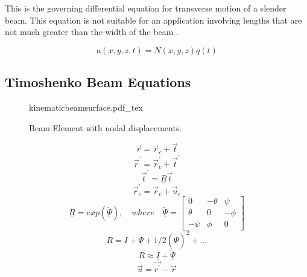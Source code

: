 This is the governing differential equation for transverse motion of a slender beam. This equation is not suitable for an application involving lengths that are not much greater than the width of the beam \cite{genta2007dynamics}.

\begin{equation} \label{eq:FEGoverning}
u(x,y,z,t)=N(x,y,z)q(t)
\end{equation}

\subsection{Timoshenko Beam Equations}

\begin{figure}
	\centering
	\def\svgwidth{400pt}
	{kinematicbeamsurface.pdf_tex}
	\caption{Beam Element with nodal displacements.}
	\label{fig:KineBeamElem}
\end{figure}
\begin{equation}\label{eq:r}
\vec{r}=\vec{r}_c+\vec{t}
\end{equation}
\begin{equation}\label{eq:rprime}
\vec{r}^\prime=\vec{r}_c^\prime+\vec{t}^\prime
\end{equation}
\begin{equation}\label{eq:trot}
\vec{t}^\prime=\underline{R}\vec{t}
\end{equation}
\begin{equation}\label{eq:rtrans}
\vec{r}_c^\prime=\vec{r}_c+\vec{u}_c
\end{equation}
\begin{equation}\label{eq:RotTransformation}
\underline{R}=exp\left(\tilde{\underline{\Psi}}\right), \quad where\quad \tilde{\underline{\Psi}}=\left[\begin{array}{ccc}
0&-\theta&\psi\\
\theta&0&-\phi\\
-\psi&\phi&0
\end{array}\right]
\end{equation}
\begin{equation}\label{eq:RotTransformationExpanded}
R=\underline{I}+\tilde{\underline{\Psi}}+1/2\left(\tilde{\underline{\Psi}}\right)^2+...
\end{equation}
\begin{equation}\label{eq:RotTransformationApprox}
R\approx\underline{I}+\tilde{\underline{\Psi}}
\end{equation}
\begin{equation}\label{eq:DispVectorrpr}
\vec{u}=\vec{r^\prime}-\vec{r}
\end{equation}
